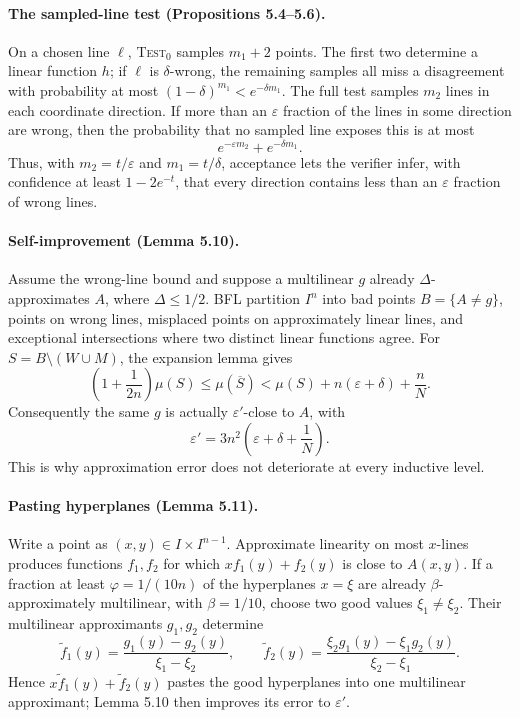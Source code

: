 \documentclass[10pt]{article}
\begin{document}
\paragraph{The sampled-line test (Propositions 5.4--5.6).}
On a chosen line $\ell$, \textsc{Test}$_0$ samples $m_1+2$ points.  The first
two determine a linear function $h$; if $\ell$ is $\delta$-wrong, the remaining
samples all miss a disagreement with probability at most
$(1-\delta)^{m_1}<e^{-\delta m_1}$.  The full test samples $m_2$ lines in each
coordinate direction.  If more than an $\varepsilon$ fraction of the lines in
some direction are wrong, then the probability that no sampled line exposes
this is at most
\[
 e^{-\varepsilon m_2}+e^{-\delta m_1}.
\]
Thus, with $m_2=t/\varepsilon$ and $m_1=t/\delta$, acceptance lets the verifier
infer, with confidence at least $1-2e^{-t}$, that every direction contains
less than an $\varepsilon$ fraction of wrong lines.

\paragraph{Self-improvement (Lemma 5.10).}
Assume the wrong-line bound and suppose a multilinear $g$ already
$\Delta$-approximates $A$, where $\Delta\leq1/2$.  BFL partition $I^n$ into
bad points $B=\{A\neq g\}$, points on wrong lines, misplaced points on
approximately linear lines, and exceptional intersections where two distinct
linear functions agree.  For
$S=B\setminus(W\cup M)$, the expansion lemma gives
\[
 \left(1+\frac1{2n}\right)\mu(S)
 \leq \mu(\overline S)
 < \mu(S)+n(\varepsilon+\delta)+\frac nN.
\]
Consequently the same $g$ is actually $\varepsilon'$-close to $A$, with
\[
 \varepsilon'=3n^2\!\left(\varepsilon+\delta+\frac1N\right).
\]
This is why approximation error does not deteriorate at every inductive level.

\paragraph{Pasting hyperplanes (Lemma 5.11).}
Write a point as $(x,y)\in I\times I^{n-1}$.  Approximate linearity on most
$x$-lines produces functions $f_1,f_2$ for which
$xf_1(y)+f_2(y)$ is close to $A(x,y)$.  If a fraction at least
$\varphi=1/(10n)$ of the hyperplanes $x=\xi$ are already
$\beta$-approximately multilinear, with $\beta=1/10$, choose two good values
$\xi_1\neq\xi_2$.  Their multilinear approximants $g_1,g_2$ determine
\[
 \widetilde f_1(y)=\frac{g_1(y)-g_2(y)}{\xi_1-\xi_2},
 \qquad
 \widetilde f_2(y)=\frac{\xi_2g_1(y)-\xi_1g_2(y)}{\xi_2-\xi_1}.
\]
Hence $x\widetilde f_1(y)+\widetilde f_2(y)$ pastes the good hyperplanes into
one multilinear approximant; Lemma 5.10 then improves its error to
$\varepsilon'$.
\end{document}
